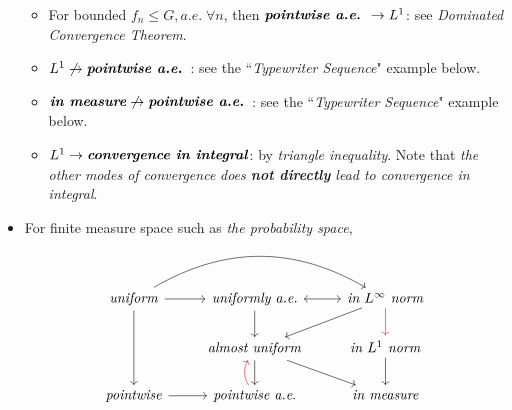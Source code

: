 \documentclass[11pt]{article}
\begin{document}
\begin{itemize}
\begin{remark}
\begin{itemize}
\item For bounded $f_n \le G, a.e.\; \forall n$, then $\text{\emph{\textbf{pointwise a.e.}} } \rightarrow L^{1}$: see \emph{Dominated Convergence Theorem}. 
\item $L^{1}  \not\rightarrow \text{\emph{\textbf{pointwise a.e.}} }$: see the ``\emph{Typewriter Sequence}" example below.
\item $\text{\emph{\textbf{in measure}}} \not\rightarrow \text{\emph{\textbf{pointwise a.e.}} }$: see the ``\emph{Typewriter Sequence}" example below.
\item $L^{1}  \rightarrow \text{\emph{\textbf{convergence in integral}}}$:  by \emph{triangle inequality}. Note that \emph{the other modes of convergence} \emph{does \textbf{not directly} lead to convergence in integral}.
\end{itemize} 
\end{remark}


\item \begin{remark}
For finite measure space such as \emph{the probability space}, 
\[
  \begin{tikzcd}
     \text{\emph{uniform}} \arrow{dd}{}  \arrow{r}{}  \arrow[rr, swap, bend left] & \text{\emph{uniformly a.e.}}  \arrow{d}{} &\arrow[l, leftrightarrow] \text{\emph{in $L^{\infty}$ norm}} \arrow{dl}{} \arrow[d,  red]  \\
      & \text{\emph{almost uniform}}  \arrow{d}{} \arrow{dr}{} &  \text{\emph{in $L^{1}$ norm}} \arrow{d}{} \\
    \text{\emph{pointwise}}  \arrow{r}{} &   \text{\emph{pointwise a.e}.} \arrow[u, bend left, red] & \text{\emph{in measure}}
  \end{tikzcd}
\] 
\end{remark}
\end{itemize}

\newpage
\end{document}

